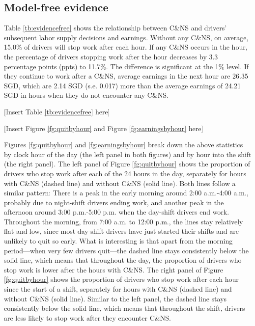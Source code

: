 \documentclass[reviewmode]{restat}
\begin{document}
\subsection{Model-free evidence}
Table \ref{tb:evidencefree} shows the relationship between C\&NS and drivers' subsequent labor supply 
decisions and earnings. %
Without any C\&NS, on average, 15.0\% of drivers will stop work after each hour.
If any C\&NS occurs in the hour, the percentage of drivers stopping work after the hour decreases by 3.3
percentage points (ppts) to 11.7\%. The difference is significant at the 1\% level. If they continue to 
work after a C\&NS, average earnings in the next hour are 26.35 SGD, which are 2.14 SGD
(s.e. 0.017) more than the average earnings of 24.21 SGD in hours when they do not encounter any C\&NS. 

\begin{center}
	[Insert Table \ref{tb:evidencefree} here]
\end{center}

\begin{center}
	[Insert Figure \ref{fg:quitbyhour} and Figure \ref{fg:earningsbyhour} here]
\end{center}


Figures \ref{fg:quitbyhour} and \ref{fg:earningsbyhour} break down the above statistics by clock hour 
of the day (the left panel in both figures) and by hour into the shift (the right panel). 
The left panel of Figure \ref{fg:quitbyhour} shows the proportion of drivers who stop work after each
of the 24 hours in the day, separately for hours with C\&NS (dashed line) and without C\&NS (solid line).
Both lines follow a similar pattern: There is a peak in the early morning around 2:00 a.m.-4:00 a.m., 
probably due to night-shift drivers ending work, and another peak in the afternoon around 3:00 p.m.-5:00 p.m.
when the day-shift drivers end work. Throughout the morning, from 7:00 a.m. to 12:00 p.m., the lines stay
relatively flat and low, since most day-shift drivers have just started their shifts and are unlikely to 
quit so early. What is interesting is that apart from the morning period---when very few drivers quit---the 
dashed line stays consistently below the solid line, which means that throughout  the day, the proportion
of drivers who stop work is lower after the hours with C\&NS. The right panel of Figure \ref{fg:quitbyhour}
shows the proportion of drivers who stop work after each hour since the start of a shift, separately for
hours with C\&NS (dashed line) and without C\&NS (solid line). Similar to the left panel, the dashed line
stays consistently below the solid line, which means that throughout the shift, drivers are less likely to
stop work after they encounter C\&NS.
\end{document}
